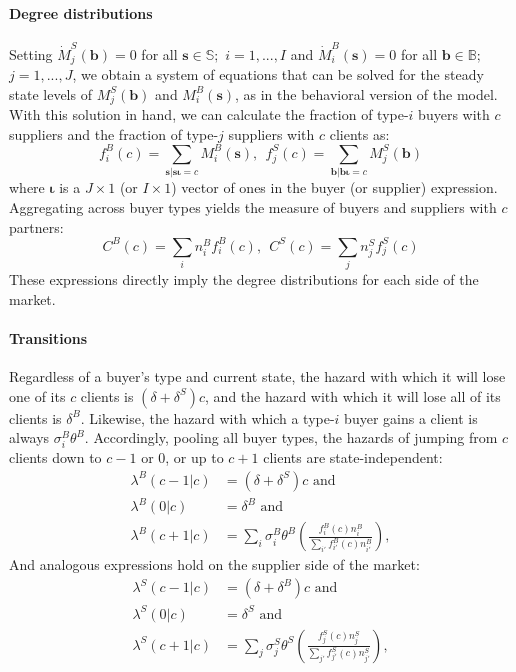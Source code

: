 \documentclass[12pt]{article} \usepackage{amsmath,amssymb,amsthm,geometry,graphicx,setspace,algorithm,algpseudocode,float}
\newcommand{\subsubsubsection}[1]{\paragraph{#1}}
\begin{document}
\subsubsubsection{Degree distributions}

Setting $\dot{M}_{j}^{S}(\mathbf{b})=0$ for all $\mathbf{s}\in\mathbb{S};$
$i=1,...,I$ and $\dot{M}_{i}^{B}(\mathbf{s})=0$ for all $\mathbf{b}\in\mathbb{B};$
$j=1,...,J$, we obtain a system of equations that can be solved for the steady state
levels of $M_{j}^{S}(\mathbf{b})$ and $M_{i}^{B}(\mathbf{s})$, as
in the behavioral version of the model.  With this solution in hand, we can calculate
the fraction of type-$i$ buyers with $c$ suppliers and the fraction
of type-$j$ suppliers with $c$ clients as:
\[
f_{i}^{B}(c)=\sum_{\mathbf{s|s\boldsymbol{\iota}=}c}M_{i}^{B}(\mathbf{s}),\:\:f_{j}^{S}(c)=\sum_{\mathbf{b|b\boldsymbol{\iota}=}c}M_{j}^{S}(\mathbf{b})
\]
where $\boldsymbol{\iota}$ is a $J\times1$ (or $I\times1$) vector
of ones in the buyer (or supplier) expression. Aggregating across buyer
types yields the measure of buyers and suppliers with $c$ partners:
\[
C^{B}(c)=\sum_{i}n_{i}^{B}f_{i}^{B}(c),\:\:C^{S}(c)=\sum_{j}n_{j}^{S}f_{j}^{S}(c)
\]
These expressions directly imply the degree distributions for each
side of the market.

\subsubsubsection{Transitions}

Regardless of a buyer's type and current state, the hazard with which
it will lose one of its $c$ clients is $(\delta + \delta^S)c$, and the hazard with which it will lose all of its clients is $\delta^B$. Likewise,
the hazard with which a type-$i$ buyer gains a client is always $\sigma_{i}^{B}\theta^{B}.$
Accordingly, pooling all buyer types, the hazards of jumping from
$c$ clients down to $c-1$ or $0$, or up to $c+1$ clients are state-independent:
\begin{align*}
\lambda^{B}(c-1|c) & =(\delta + \delta^S) c\text{ and }\\
\lambda^{B}(0|c) & =\delta^B \text{ and }\\
\lambda^{B}(c+1|c) & =\sum_{i}\sigma_{i}^{B}\theta^{B}\left(\frac{f_{i}^{B}(c)n_{i}^{B}}{\sum_{i'}f_{i'}^{B}(c)n_{i'}^{B}}\right),
\end{align*}
And analogous expressions hold on the supplier side of the market:
\begin{align*}
\lambda^{S}(c-1|c) & =(\delta + \delta^B) c\text{ and }\\
\lambda^{S}(0|c) & =\delta^S\text{ and }\\
\lambda^{S}(c+1|c) & =\sum_{j}\sigma_{j}^{S}\theta^{S}\left(\frac{f_{j}^{S}(c)n_{j}^{S}}{\sum_{j'}f_{j'}^{S}(c)n_{j'}^{S}}\right),
\end{align*}
\end{document}
